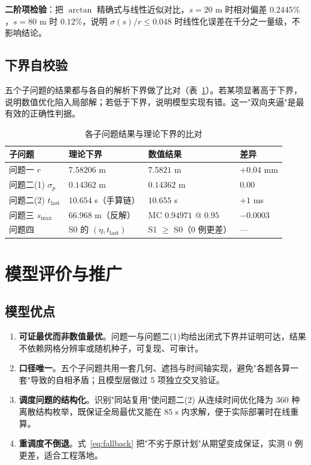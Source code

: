 \documentclass[UTF8,a4paper,zihao=-4,oneside]{ctexart}
\begin{document}
\textbf{二阶项检验}：把 $\arctan$ 精确式与线性近似对比，$s=20$ m 时相对偏差 $0.2445\%$，$s=80$ m 时 $0.12\%$，说明 $\sigma(s)/r\le0.048$ 时线性化误差在千分之一量级，不影响结论。

\subsection{下界自校验}

五个子问题的结果都与各自的解析下界做了比对（表~\ref{tab:lower}）。若某项显著高于下界，说明数值优化陷入局部解；若低于下界，说明模型实现有错。这一"双向夹逼"是最有效的正确性判据。

\begin{table}[htbp]
  \centering
  \caption{各子问题结果与理论下界的比对}
  \label{tab:lower}
  \begin{tabular}{llll}
    \toprule
    子问题 & 理论下界 & 数值结果 & 差异 \\
    \midrule
    问题一 $r$ & $7.58206$ m & $7.5821$ m & $+0.04$ mm \\
    问题二(1) $\sigma_p$ & $0.14362$ m & $0.14362$ m & $0.00$ \\
    问题二(2) $t_{\mathrm{last}}$ & $10.654$ s（手算链） & $10.655$ s & $+1$ ms \\
    问题三 $s_{\max}$ & $66.968$ m（反解） & MC $0.94971$ @ $0.95$ & $-0.0003$ \\
    问题四 & S0 的 $(\eta,t_{\mathrm{last}})$ & S1 $\ge$ S0（$0$ 例更差） & — \\
    \bottomrule
  \end{tabular}
\end{table}

\section{模型评价与推广}

\subsection{模型优点}

\begin{enumerate}[leftmargin=2em]
  \item \textbf{可证最优而非数值最优}。问题一与问题二(1)均给出闭式下界并证明可达，结果不依赖网格分辨率或随机种子，可复现、可审计。
  \item \textbf{口径唯一}。五个子问题共用一套几何、遮挡与时间轴实现，避免"各题各算一套"导致的自相矛盾；且模型层做过 5 项独立交叉验证。
  \item \textbf{调度问题的结构化}。识别"同站复用"使问题二(2) 从连续时间优化降为 360 种离散结构枚举，既保证全局最优又能在 $85$ s 内求解，便于实际部署时在线重算。
  \item \textbf{重调度不倒退}。式~\eqref{eq:fallback} 把"不劣于原计划"从期望变成保证，实测 $0$ 例更差，适合工程落地。
\end{enumerate}
\end{document}
